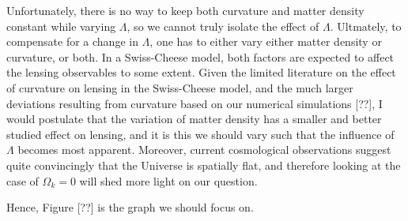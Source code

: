 Unfortunately, there is no way to keep both curvature and matter density constant while varying $\Lambda$, so we cannot truly isolate the effect of $\Lambda$. Ultmately, to compensate for a change in $\Lambda$, one has to either vary either matter density or curvature, or both. In a Swiss-Cheese model, both factors are expected to affect the lensing observables to some extent. Given the limited literature on the effect of curvature on lensing in the Swiss-Cheese model, and the much larger deviations resulting from curvature based on our numerical simulations [??], I would postulate that the variation of matter density has a smaller and better studied effect on lensing, and it is this we should vary such that the influence of $\Lambda$ becomes most apparent. Moreover, current cosmological observations \citep{ade2016planck,hinshaw2013nine,de2000flat} suggest quite convincingly that the Universe is spatially flat, and therefore looking at the case of $\Omega_k = 0$ will shed more light on our question. 

Hence, Figure [??] is the graph we should focus on. 


